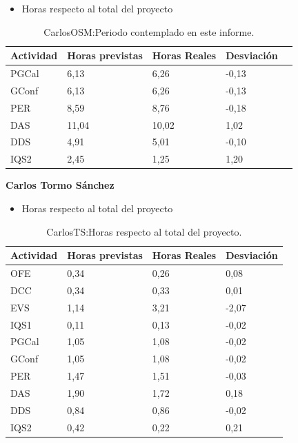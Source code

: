 \begin{itemize}
\item Horas respecto al total del proyecto
\end{itemize}
\begin{table}[H]
\begin{center}
\begin{tabular}{ l l l l l }
  Actividad & Horas previstas & Horas Reales & Desviación \\ \hline \hline
PGCal	&	6,13	&	6,26	&	-0,13	\\ \hline
GConf	&	6,13	&	6,26	&	-0,13	\\ \hline
PER	&	8,59	&	8,76	&	-0,18	\\ \hline
DAS	&	11,04	&	10,02	&	1,02	\\ \hline
DDS	&	4,91	&	5,01	&	-0,10	\\ \hline
IQS2	&	2,45	&	1,25	&	1,20	\\ \hline
\end{tabular}
\caption{CarlosOSM:Periodo contemplado en este informe.}
\label{tab:CarlosOSM:PeriodoContempladoInforme_2}
\end{center}
\end{table}

\newpage


\textbf{Carlos Tormo Sánchez}
\begin{itemize}
\item Horas respecto al total del proyecto
\end{itemize}
\begin{table}[H]
\begin{center}
\begin{tabular}{ l l l l }
Actividad & Horas previstas & Horas Reales & Desviación \\ \hline \hline
OFE	&	0,34	&	0,26	&	0,08	\\ \hline
DCC	&	0,34	&	0,33	&	0,01	\\ \hline
EVS	&	1,14	&	3,21	&	-2,07	\\ \hline
IQS1	&	0,11	&	0,13	&	-0,02	\\ \hline
PGCal	&	1,05	&	1,08	&	-0,02	\\ \hline
GConf	&	1,05	&	1,08	&	-0,02	\\ \hline
PER	&	1,47	&	1,51	&	-0,03	\\ \hline
DAS	&	1,90	&	1,72	&	0,18	\\ \hline
DDS	&	0,84	&	0,86	&	-0,02	\\ \hline
IQS2	&	0,42	&	0,22	&	0,21	\\ \hline
\end{tabular}
\caption{CarlosTS:Horas respecto al total del proyecto.}
\label{tab:CarlosTS:HorasTotalInforme_2}
\end{center}
\end{table}

